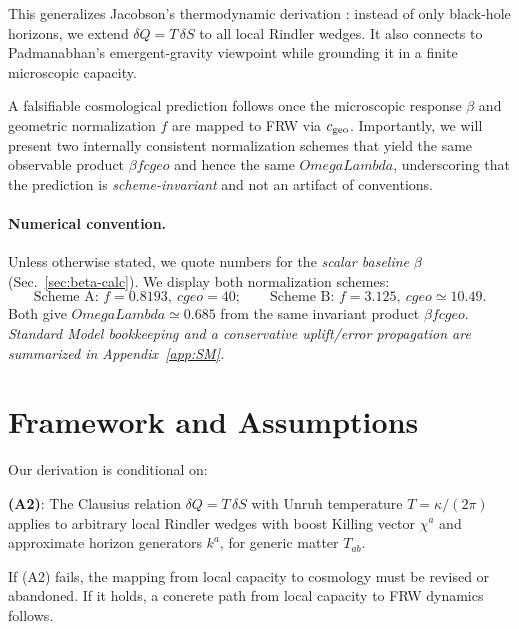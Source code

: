 \documentclass[aps,prd,onecolumn,superscriptaddress,nofootinbib]{revtex4-2}
\def\OmL{OmegaLambda}%
\def\cgeo{cgeo}%
\newcommand{\OmL}{\Omega_\Lambda}
\newcommand{\cgeo}{c_{\rm geo}}
\begin{document}
This generalizes Jacobson’s thermodynamic derivation \cite{Jacobson1995}: instead of only black-hole horizons, we extend \(\delta Q = T\,\delta S\) to all local Rindler wedges. It also connects to Padmanabhan’s emergent-gravity viewpoint \cite{Padmanabhan2010} while grounding it in a finite microscopic capacity.

A falsifiable cosmological prediction follows once the microscopic response \(\beta\) and geometric normalization \(f\) are mapped to FRW via \(c_{\rm geo}\). Importantly, we will present two internally consistent normalization schemes that yield the same observable product \(\beta f \cgeo\) and hence the same \(\OmL\), underscoring that the prediction is \emph{scheme-invariant} and not an artifact of conventions.

\paragraph*{Numerical convention.}
Unless otherwise stated, we quote numbers for the \emph{scalar baseline} \(\beta\) (Sec.~\ref{sec:beta-calc}). We display both normalization schemes:
\[
\text{Scheme A: } f=0.8193,\ \cgeo=40;\qquad
\text{Scheme B: } f=3.125,\ \cgeo\simeq 10.49.
\]
Both give \(\OmL\simeq 0.685\) from the same invariant product \(\beta f \cgeo\). \emph{Standard Model bookkeeping and a conservative uplift/error propagation are summarized in Appendix~\ref{app:SM}.}

\section{Framework and Assumptions}
\label{sec:assumptions}
Our derivation is conditional on:

\textbf{(A2)}: The Clausius relation \(\delta Q = T \,\delta S\) with Unruh temperature \(T = \kappa/(2\pi)\) applies to arbitrary local Rindler wedges with boost Killing vector \(\chi^a\) and approximate horizon generators \(k^a\), for generic matter \(T_{ab}\).

If (A2) fails, the mapping from local capacity to cosmology must be revised or abandoned. If it holds, a concrete path from local capacity to FRW dynamics follows.
\end{document}
